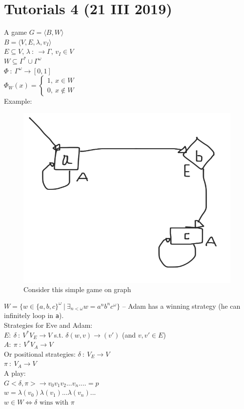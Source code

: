 \section{Tutorials 4 (21 III 2019)}
A game $G = \langle B, W \rangle$\\
$B = \langle V, E, \lambda, v_I \rangle$\\
$E \subseteq V$, $\lambda\ :\ \rightarrow \Gamma$, $v_I \in V$\\
$W \subseteq \Gamma^{*} \cup \Gamma^{\omega}$\\
$\Phi\ :\ \Gamma^{\omega} \rightarrow [0, 1]$\\
$\Phi_W(x) = \begin{cases}
1,\ x \in W\\
0,\ x \not\in W
\end{cases}$\\

\noindent
Example:
\begin{figure}[H]
	\centering
	\caption{Consider this simple game on graph}
	\includegraphics[scale=0.2]{content/graphics/game1.png}
\end{figure}
\noindent
$W = \{w \in \{a, b, c\}^{\omega}\ |\ \exists_{n < \omega} w = a^nb^nc^{\omega}\}$ -- Adam has a winning strategy
(he can infinitely loop in \texttt{a}).\\

\noindent
Strategies for Eve and Adam:\\
$E:\ \delta\ :\ V^{*}V_E \rightarrow V$ s.t. $\delta(w, v) \rightarrow (v')$ (and $v,v' \in E$)\\
$A:\ \pi\ :\ V^{*}V_A \rightarrow V$\\
Or positional strategies:
$\delta\ :\ V_E \rightarrow V$\\
$\pi\ :\ V_A \rightarrow V$\\
A play:\\
$G<\delta, \pi> \rightarrow v_0v_1v_2...v_n.... = p$\\
$w = \lambda(v_0)\lambda(v_1)...\lambda(v_n)...$\\
$w \in W \Leftrightarrow \delta\text{ wins with }\pi$\\

